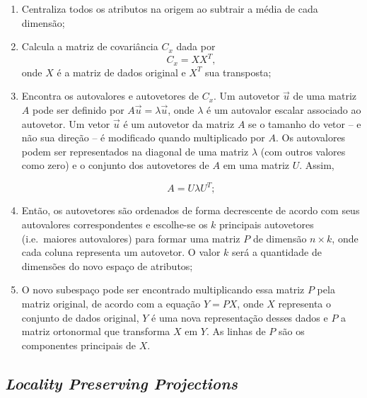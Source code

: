\begin{enumerate}
\item Centraliza todos os atributos na origem ao subtrair a média de cada dimensão;
\item Calcula a matriz de covariância $C_x$ dada por
\begin{equation}
    C_x = X X^T,
\end{equation}
\noindent onde $X$ é a matriz de dados original e $X^T$ sua transposta;

\item Encontra os autovalores e autovetores de $C_x$. Um autovetor $\vec{u}$ de uma matriz $A$ pode ser definido por $A\vec{u} = \lambda \vec{u}$, onde $\lambda$ é um autovalor escalar associado ao autovetor. Um vetor $\vec{u}$ é um autovetor da matriz $A$ se o tamanho do vetor -- e não sua direção -- é modificado quando multiplicado por $A$. Os autovalores podem ser representados na diagonal de uma matriz $\lambda$ (com outros valores como zero) e o conjunto dos autovetores de $A$ em uma matriz $U$. Assim,

\begin{equation}
    A = U \lambda U^T;
\end{equation}

\item Então, os autovetores são ordenados de forma decrescente de acordo com seus autovalores correspondentes e escolhe-se os $k$ principais autovetores (i.e.\ maiores autovalores) para formar uma matriz $P$ de dimensão $n \times k$, onde cada coluna representa um autovetor. O valor $k$ será a quantidade de dimensões do novo espaço de atributos;
\item O novo subespaço pode ser encontrado multiplicando essa matriz $P$ pela matriz original, de acordo com a equação $Y = PX$, onde $X$ representa o conjunto de dados original, $Y$ é uma nova representação desses dados e $P$ a matriz ortonormal que transforma $X$ em $Y$. As linhas de $P$ são os componentes principais de $X$.
\end{enumerate}

\subsection{\textit{Locality Preserving Projections}}
\label{sec:lpp}

